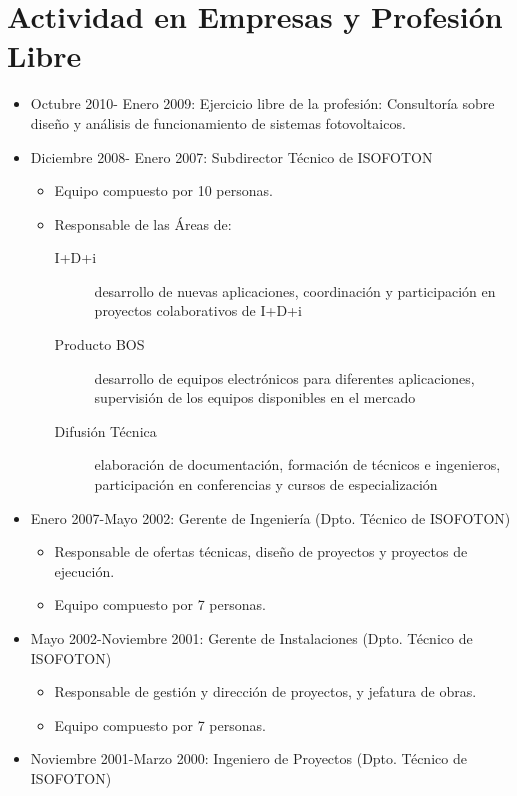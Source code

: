 \documentclass[article, a4paper]{memoir}
\begin{document}
\section{Actividad en Empresas y Profesión Libre}
\label{sec:org9be2dca}

\begin{itemize}
\item Octubre 2010- Enero 2009: Ejercicio libre de la profesión:
Consultoría sobre diseño y análisis de funcionamiento de sistemas fotovoltaicos.

\item Diciembre 2008- Enero 2007: Subdirector Técnico de ISOFOTON
\begin{itemize}
\item Equipo compuesto por 10 personas.
\item Responsable de las Áreas de:
\begin{description}
\item[{I+D+i}] desarrollo de nuevas aplicaciones, coordinación y participación en proyectos colaborativos de I+D+i
\item[{Producto BOS}] desarrollo de equipos electrónicos para diferentes aplicaciones, supervisión de los equipos disponibles en el mercado
\item[{Difusión Técnica}] elaboración de documentación, formación de técnicos e ingenieros, participación en conferencias y cursos de especialización
\end{description}
\end{itemize}

\item Enero 2007-Mayo 2002: Gerente de Ingeniería (Dpto. Técnico de ISOFOTON)
\begin{itemize}
\item Responsable de ofertas técnicas, diseño de proyectos y proyectos de ejecución.
\item Equipo compuesto por 7 personas.
\end{itemize}

\item Mayo 2002-Noviembre 2001: Gerente de Instalaciones (Dpto. Técnico de ISOFOTON)
\begin{itemize}
\item Responsable de gestión y dirección de proyectos, y jefatura de obras.
\item Equipo compuesto por 7 personas.
\end{itemize}

\item Noviembre 2001-Marzo 2000: Ingeniero de Proyectos (Dpto. Técnico de ISOFOTON)
\end{itemize}
\end{document}
